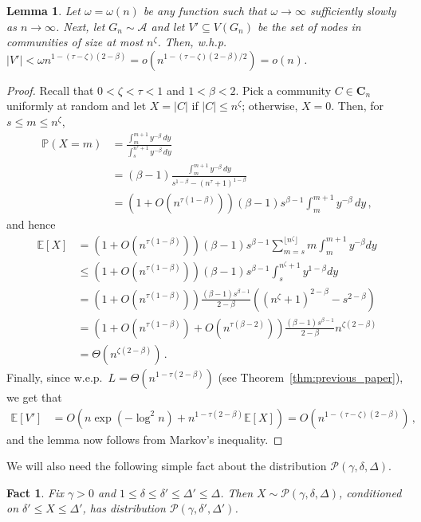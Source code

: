 \documentclass[12pt]{article}
\newtheorem{lemma}[theorem]{Lemma}
\newtheorem{fact}[theorem]{Fact}
\theoremstyle{definition}
\theoremstyle{remark}
\theoremstyle{remark}
\numberwithin{theorem}{section}
\newcommand{\E}[1]{{\mathbb E}\left[#1\right]}
\newcommand{\p}[1]{\mathbb{P}\left(#1\right)}
\newcommand{\abcdDist}{\ensuremath{\mathcal{A}}}
\newcommand{\tpl}[3]{\ensuremath{\mathcal{P}\left(#1,#2,#3\right)}}
\begin{document}
\begin{lemma}\label{lem:open communities}
Let $\omega = \omega(n)$ be any function such that $\omega \to \infty$ sufficiently slowly as $n \to \infty$. Next, let $G_n \sim \abcdDist$ and let $V' \subseteq V(G_n)$ be the set of nodes in communities of size at most $n^\zeta$. Then, w.h.p.\ $|V'| < \omega n^{1-(\tau-\zeta)(2-\beta)} = o(n^{1-(\tau-\zeta)(2-\beta)/2}) = o(n)$. 
\end{lemma}

\begin{proof}
Recall that $0 < \zeta < \tau < 1$ and $1 < \beta < 2$. Pick a community $C \in \textbf{C}_n$ uniformly at random and let $X = |C|$ if $|C| \le n^{\zeta}$; otherwise, $X=0$. Then, for $s \leq m \leq n^\zeta$,
\begin{align*}
\p{X = m} 
&= 
\frac{\int_m^{m +1} y^{-\beta} \, dy}{\int_s^{n^{\tau}+1} y^{-\beta} \, dy}\\ 
&= 
(\beta-1) \frac{\int_m^{m +1} y^{-\beta} \, dy}{s^{1-\beta} - (n^\tau+1)^{1-\beta}}\\
&=
\left( 1 + O(n^{\tau(1-\beta)}) \right) (\beta-1) s^{\beta-1} \int_m^{m+1} y^{-\beta} \, dy \,,
\end{align*}
and hence
\begin{align*}
\E{X} 
&= \left( 1 + O(n^{\tau(1-\beta)}) \right) (\beta-1) s^{\beta-1} \sum_{m = s}^{\lfloor n^{\zeta} \rfloor} m \int_m^{m +1} y^{-\beta} dy \\
&\leq
\left( 1 + O(n^{\tau(1-\beta)}) \right) (\beta-1) s^{\beta-1} \int_s^{n^{\zeta}+1} y^{1-\beta} dy \\
&= 
\left( 1 + O(n^{\tau(1-\beta)}) \right) \frac{(\beta-1) s^{\beta-1}}{2-\beta} \left( (n^\zeta+1)^{2-\beta} - s^{2-\beta} \right)\\
&=
\left( 1 + O(n^{\tau(1-\beta)}) + O(n^{\tau(\beta-2)}) \right) \frac{(\beta-1) s^{\beta-1}}{2-\beta} n^{\zeta(2-\beta)} \\
&=
\Theta \left( n^{\zeta(2-\beta)} \right) \,.
\end{align*}
Finally, since w.e.p.\ $L = \Theta\left( n^{1-\tau(2-\beta)} \right)$ (see Theorem~\ref{thm:previous_paper}), we get that
\begin{align*}
\E{V'} 
&=
O\left( n \exp(-\log^2 n) + n^{1-\tau(2-\beta)} \E{X} \right)
= 
O\left( n^{1-(\tau-\zeta)(2-\beta)}  \right) \,,
\end{align*}
and the lemma now follows from Markov's inequality. 
\end{proof}

We will also need the following simple fact about the distribution $\tpl{\gamma}{\delta}{\Delta}$.
\begin{fact}\label{fact:tpl condition}
Fix $\gamma > 0$ and $1 \le \delta \le \delta' \le \Delta' \le \Delta$. Then $X \sim \tpl{\gamma}{\delta}{\Delta}$, conditioned on $\delta' \leq X \leq \Delta'$, has distribution $\tpl{\gamma}{\delta'}{\Delta'}$.
\end{fact}
\end{document}
